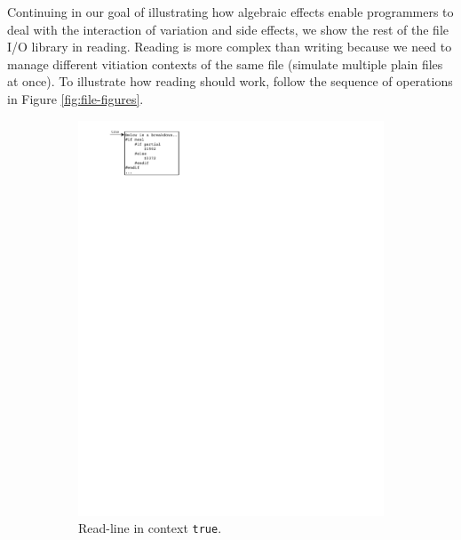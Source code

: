 Continuing in our goal of illustrating how algebraic effects enable programmers to deal with the interaction of variation and side effects, we show the rest of the file I/O library in reading. Reading is more complex than writing because we need to manage different vitiation contexts of the same file (simulate multiple plain files at once). To illustrate how reading should work, follow the sequence of operations in Figure \ref{fig:file-figures}. 

%
\begin{figure}[!htb]
\begin{subfigure}[b]{.33\textwidth}
  \centering
  \includegraphics[scale=0.75]{figures/vfile-Page-1.pdf}
  \caption{Read-line in context \texttt{true}.}
  \label{fig:file1}
\end{subfigure}
\begin{subfigure}[b]{.33\textwidth}
  \centering

\end{subfigure}
\end{figure}
